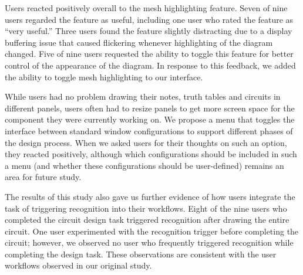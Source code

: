 \documentclass{elsart}
\begin{document}
Users reacted positively overall to the mesh highlighting feature.
Seven of nine users regarded the feature as useful, including one user
who rated the feature as ``very useful.''  Three users found the
feature slightly distracting due to a display buffering issue that
caused flickering whenever highlighting of the diagram changed.  Five of
nine users requested the ability to toggle this feature for better
control of the appearance of the diagram.  In response to this
feedback, we added the ability to toggle mesh highlighting to our
interface.

While users had no problem drawing their notes, truth tables and
circuits in different panels, users often had to resize panels to get
more screen space for the component they were currently working on.
We propose a menu that toggles the interface between standard window
configurations to support different phases of the design process.  When
we asked users for their thoughts on such an option, they reacted
positively, although which configurations should be included in such a
menu (and whether these configurations should be user-defined) remains
an area for future study.




The results of this study also gave us further evidence of how users
integrate the task of triggering recognition into their workflows.
Eight of the nine users who completed the circuit design task
triggered recognition after drawing the entire circuit.  One user
experimented with the recognition trigger before completing the
circuit; however, we observed no user who frequently triggered
recognition while completing the design task.  These observations are
consistent with the user workflows observed in our original study.  
\end{document}
